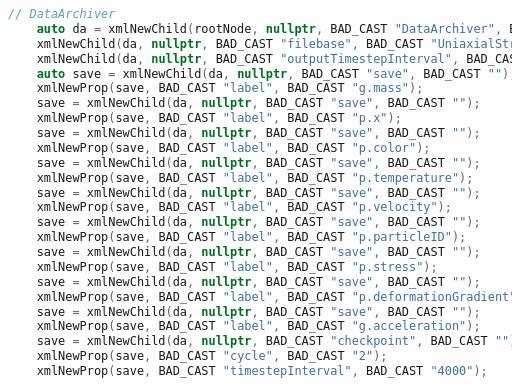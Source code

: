 \begin{enumerate}
\begin{lstlisting}[language=Cpp]
    // DataArchiver
    auto da = xmlNewChild(rootNode, nullptr, BAD_CAST "DataArchiver", BAD_CAST "");
    xmlNewChild(da, nullptr, BAD_CAST "filebase", BAD_CAST "UniaxialStrainRotateTabularPlasticity.uda");
    xmlNewChild(da, nullptr, BAD_CAST "outputTimestepInterval", BAD_CAST "1");
    auto save = xmlNewChild(da, nullptr, BAD_CAST "save", BAD_CAST ""); 
    xmlNewProp(save, BAD_CAST "label", BAD_CAST "g.mass");
    save = xmlNewChild(da, nullptr, BAD_CAST "save", BAD_CAST ""); 
    xmlNewProp(save, BAD_CAST "label", BAD_CAST "p.x");
    save = xmlNewChild(da, nullptr, BAD_CAST "save", BAD_CAST ""); 
    xmlNewProp(save, BAD_CAST "label", BAD_CAST "p.color");
    save = xmlNewChild(da, nullptr, BAD_CAST "save", BAD_CAST ""); 
    xmlNewProp(save, BAD_CAST "label", BAD_CAST "p.temperature");
    save = xmlNewChild(da, nullptr, BAD_CAST "save", BAD_CAST ""); 
    xmlNewProp(save, BAD_CAST "label", BAD_CAST "p.velocity");
    save = xmlNewChild(da, nullptr, BAD_CAST "save", BAD_CAST ""); 
    xmlNewProp(save, BAD_CAST "label", BAD_CAST "p.particleID");
    save = xmlNewChild(da, nullptr, BAD_CAST "save", BAD_CAST ""); 
    xmlNewProp(save, BAD_CAST "label", BAD_CAST "p.stress");
    save = xmlNewChild(da, nullptr, BAD_CAST "save", BAD_CAST ""); 
    xmlNewProp(save, BAD_CAST "label", BAD_CAST "p.deformationGradient");
    save = xmlNewChild(da, nullptr, BAD_CAST "save", BAD_CAST ""); 
    xmlNewProp(save, BAD_CAST "label", BAD_CAST "g.acceleration");
    save = xmlNewChild(da, nullptr, BAD_CAST "checkpoint", BAD_CAST "");
    xmlNewProp(save, BAD_CAST "cycle", BAD_CAST "2");
    xmlNewProp(save, BAD_CAST "timestepInterval", BAD_CAST "4000");


\end{lstlisting}
\end{enumerate}
